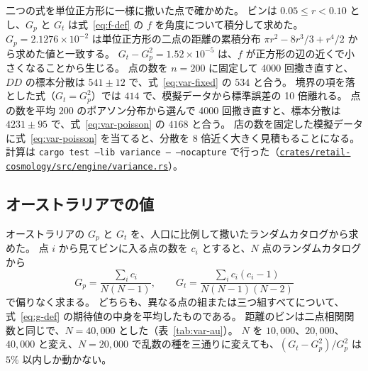 \documentclass[a4paper,11pt]{ltjsarticle}
\newcommand{\repourl}{https://github.com/inuverse44/retail-cosmology}
\newcommand{\code}[1]{\textcolor{codecolor}{\texttt{#1}}}
\begin{document}
二つの式を単位正方形に一様に撒いた点で確かめた。
ビンは $0.05 \le r < 0.10$ とし、$G_p$ と $G_t$ は式~\eqref{eq:f-def} の $f$ を角度について積分して求めた。
$G_p = 2.1276 \times 10^{-2}$ は単位正方形の二点の距離の累積分布 $\pi r^2 - 8r^3/3 + r^4/2$ から求めた値と一致する。
$G_t - G_p^2 = 1.52 \times 10^{-5}$ は、$f$ が正方形の辺の近くで小さくなることから生じる。
点の数を $n = 200$ に固定して 4000 回撒き直すと、$DD$ の標本分散は $541 \pm 12$ で、式~\eqref{eq:var-fixed} の $534$ と合う。
境界の項を落とした式（$G_t = G_p^2$）では $414$ で、模擬データから標準誤差の 10 倍離れる。
点の数を平均 $200$ のポアソン分布から選んで 4000 回撒き直すと、標本分散は $4231 \pm 95$ で、式~\eqref{eq:var-poisson} の $4168$ と合う。
店の数を固定した模擬データに式~\eqref{eq:var-poisson} を当てると、分散を 8 倍近く大きく見積もることになる。
計算は \code{cargo test --lib variance -- --nocapture} で行った（\href{\repourl/blob/main/crates/retail-cosmology/src/engine/variance.rs}{\nolinkurl{crates/retail-cosmology/src/engine/variance.rs}}）。

\subsection{オーストラリアでの値}

オーストラリアの $G_p$ と $G_t$ を、人口に比例して撒いたランダムカタログから求めた。
点 $i$ から見てビンに入る点の数を $c_i$ とすると、$N$ 点のランダムカタログから
\begin{equation}
  G_p = \frac{\sum_i c_i}{N(N-1)}, \qquad
  G_t = \frac{\sum_i c_i (c_i - 1)}{N(N-1)(N-2)}
  \label{eq:g-estimate}
\end{equation}
で偏りなく求まる。
どちらも、異なる点の組または三つ組すべてについて、式~\eqref{eq:g-def} の期待値の中身を平均したものである。
距離のビンは二点相関関数と同じで、$N = 40{,}000$ とした（表~\ref{tab:var-au}）。
$N$ を $10{,}000$、$20{,}000$、$40{,}000$ と変え、$N = 20{,}000$ で乱数の種を三通りに変えても、$(G_t - G_p^2)/G_p^2$ は $5\%$ 以内しか動かない。

\begin{table}[t]
  \centering
  \caption{オーストラリアの幾何の因子と、$DD$ の相対標準偏差 $\sqrt{\mathrm{Var}[DD]}/\mathbb{E}[DD]$。
    「固定」は店の数を固定した式~\eqref{eq:var-fixed}、「ポアソン」は店の数をポアソン分布で揺らした式~\eqref{eq:var-poisson} による。
    $G_p$ と $G_t$ は人口に比例して撒いた $40{,}000$ 点のランダムカタログから式~\eqref{eq:g-estimate} で求めた。}
  \label{tab:var-au}
  \small
  
\end{table}
\end{document}
